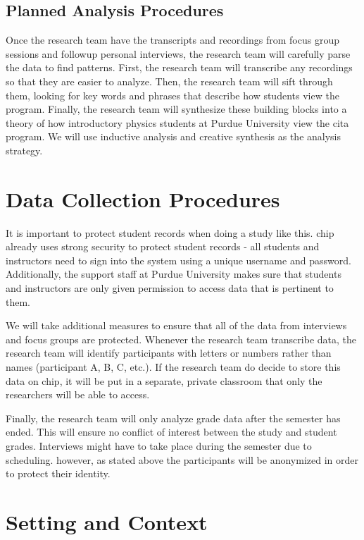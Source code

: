 \subsection{Planned Analysis Procedures}

Once the research team have the transcripts and recordings from focus group sessions and followup personal interviews, the research team will carefully parse the data to find patterns. First, the research team will transcribe any recordings so that they are easier to analyze. Then, the research team will sift through them, looking for key words and phrases that describe how students view the program. Finally, the research team will synthesize these building blocks into a theory of how introductory physics students at Purdue University view the \gls{cita} program. We will use inductive analysis and creative synthesis as the analysis strategy.

\section{Data Collection Procedures}

It is important to protect student records when doing a study like this. \gls{chip} already uses strong security to protect student records - all students and instructors need to sign into the system using a unique username and password. Additionally, the support staff at Purdue University makes sure that students and instructors are only given permission to access data that is pertinent to them.

We will take additional measures to ensure that all of the data from interviews and focus groups are protected. Whenever the research team transcribe data, the research team will identify participants with letters or numbers rather than names (participant A, B, C, etc.). If the research team do decide to store this data on \gls{chip}, it will be put in a separate, private classroom that only the researchers will be able to access.

Finally, the research team will only analyze grade data after the semester has ended. This will ensure no conflict of interest between the study and student grades. Interviews might have to take place during the semester due to scheduling. however, as stated above the participants will be anonymized in order to protect their identity.




\section{Setting and Context}

